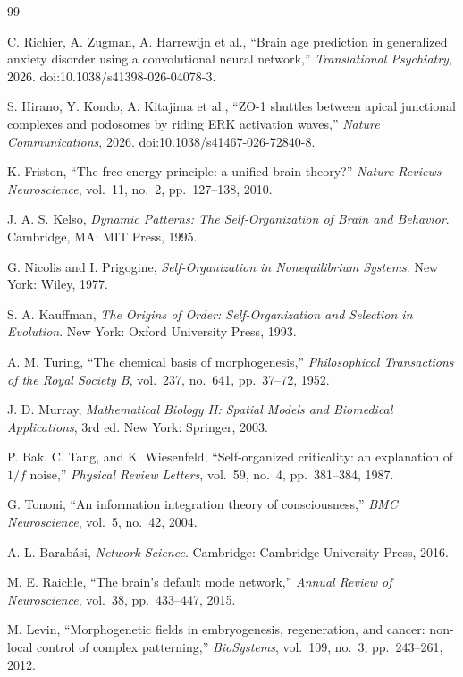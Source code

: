 \documentclass[11pt,a4paper]{article}
\theoremstyle{plain}
\theoremstyle{definition}
\begin{document}
\begin{thebibliography}{99}

C. Richier, A. Zugman, A. Harrewijn et al.,
``Brain age prediction in generalized anxiety disorder using a convolutional neural network,''
\textit{Translational Psychiatry}, 2026.
doi:10.1038/s41398-026-04078-3.

S. Hirano, Y. Kondo, A. Kitajima et al.,
``ZO-1 shuttles between apical junctional complexes and podosomes by riding ERK activation waves,''
\textit{Nature Communications}, 2026.
doi:10.1038/s41467-026-72840-8.

K. Friston,
``The free-energy principle: a unified brain theory?''
\textit{Nature Reviews Neuroscience},
vol.\ 11, no.\ 2, pp.\ 127--138, 2010.

J. A. S. Kelso,
\textit{Dynamic Patterns: The Self-Organization of Brain and Behavior}.
Cambridge, MA: MIT Press, 1995.

G. Nicolis and I. Prigogine,
\textit{Self-Organization in Nonequilibrium Systems}.
New York: Wiley, 1977.

S. A. Kauffman,
\textit{The Origins of Order: Self-Organization and Selection in Evolution}.
New York: Oxford University Press, 1993.

A. M. Turing,
``The chemical basis of morphogenesis,''
\textit{Philosophical Transactions of the Royal Society B},
vol.\ 237, no.\ 641, pp.\ 37--72, 1952.

J. D. Murray,
\textit{Mathematical Biology II: Spatial Models and Biomedical Applications},
3rd ed.
New York: Springer, 2003.

P. Bak, C. Tang, and K. Wiesenfeld,
``Self-organized criticality: an explanation of $1/f$ noise,''
\textit{Physical Review Letters},
vol.\ 59, no.\ 4, pp.\ 381--384, 1987.

G. Tononi,
``An information integration theory of consciousness,''
\textit{BMC Neuroscience},
vol.\ 5, no.\ 42, 2004.

A.-L. Barab{\'a}si,
\textit{Network Science}.
Cambridge: Cambridge University Press, 2016.

M. E. Raichle,
``The brain's default mode network,''
\textit{Annual Review of Neuroscience},
vol.\ 38, pp.\ 433--447, 2015.

M. Levin,
``Morphogenetic fields in embryogenesis, regeneration, and cancer:
non-local control of complex patterning,''
\textit{BioSystems},
vol.\ 109, no.\ 3, pp.\ 243--261, 2012.


\end{thebibliography}
\end{document}
